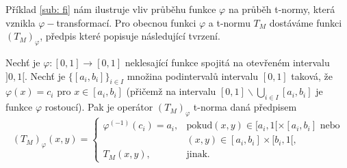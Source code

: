 Příklad \ref{sub: fi} nám ilustruje vliv průběhu funkce $\varphi$ na průběh t-normy, která vznikla $\varphi-$transformací. Pro obecnou funkci $\varphi$ a t-normu $T_M$ dostáváme funkci $(T_M)_{\varphi}$, předpis které popisuje následující tvrzení.
\begin{sentence}
\cite{smutna}
\label{t-norm}
 Nech\v t je $\varphi:[0,1]\rightarrow [0,1]$
neklesající funkce spojitá na otevřeném intervalu $]0,1[$.
Nech\v t je $\{[a_i,b_i]\}_{i\in I}$ množina podinterval\r u
intervalu $[0,1]$ taková, že $\varphi(x)=c_i$ pro $x\in
[a_i,b_i]$ (přičemž na intervalu $[0,1]\backslash \bigcup \limits_{i \in I}
[a_i,b_i]$ je funkce $\varphi$
rostoucí).
Pak je operátor $(T_M)_{\varphi}$  t-norma daná předpisem
$$ (T_M)_{\varphi}(x,y) = \begin{cases} \varphi^{(-1)}(c_i)=a_i, &\mbox {pokud
$(x,y)\in [a_i,1[\times[a_i,b_i]$ nebo}
\\ & (x,y)\in [a_i,b_i]\times[b_i,1[,
\\ T_M(x,y), &\mbox {jinak.}
\end{cases} $$
\end{sentence}
